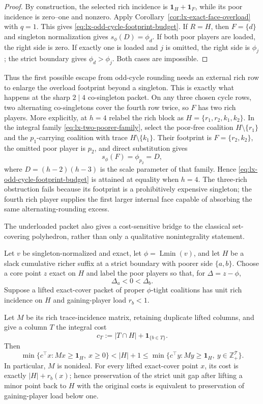\begin{proof}
By construction, the selected rich incidence is
$\mathbf1_H+\mathbf1_F$, while its poor incidence is zero--one and nonzero.
Apply Corollary~\ref{cor:lx-exact-face-overload} with $q=1$.  This gives
\eqref{eq:lx-odd-cycle-footprint-budget}.  If $R=H$, then $F=\{d\}$ and
singleton normalization gives $s_\phi(D)=\phi_d$.  If both poor players are
loaded, the right side is zero.  If exactly one is loaded and $j$ is omitted,
the right side is $\phi_j$; the strict boundary gives
$\phi_d>\phi_j$.  Both cases are impossible.
\end{proof}

Thus the first possible escape from odd-cycle rounding needs an external rich
row to enlarge the overload footprint beyond a singleton.  This is exactly
what happens at the sharp $2\mid4$ co-singleton packet.  On any three chosen
cycle rows, two alternating co-singletons cover the fourth row twice, so
$F$ has two rich players.  More explicitly, at $h=4$ relabel the rich block
as $H=\{r_1,r_2,k_1,k_2\}$.  In the integral family
\eqref{eq:lx-two-poorer-family}, select the poor-free coalition $H\setminus
\{r_1\}$ and the $p_1$-carrying coalition with trace $H\setminus\{k_1\}$.
Their footprint is $F=\{r_2,k_2\}$, the omitted poor player is $p_2$, and
direct substitution gives
\[
 s_\phi(F)=\phi_{p_2}=D,
\]
where $D=(h-2)(h-3)$ is the scale parameter of that family.  Hence
\eqref{eq:lx-odd-cycle-footprint-budget} is attained at equality when $h=4$.
The three-rich obstruction fails because its footprint is a prohibitively
expensive singleton; the fourth rich player supplies the first larger
internal face capable of absorbing the same alternating-rounding excess.

The underloaded packet also gives a cost-sensitive bridge to the classical
set-covering polyhedron, rather than only a qualitative nonintegrality
statement.

\begin{theorem}
\label{thm:lx-unit-gap-set-cover}
Let $v$ be singleton-normalized and exact, let
$\phi=\operatorname{Lmin}(v)$, and let $H$ be a slack cumulative richer
suffix at a strict boundary with poorer side $\{a,b\}$.  Choose a core point
$z$ exact on $H$ and label the poor players so that, for
$\Delta=z-\phi$,
\[
 \Delta_a<0<\Delta_b.
\]
Suppose a lifted exact-cover packet of proper $\phi$-tight coalitions has
unit rich incidence on $H$ and gaining-player load $r_b<1$.

Let $M$ be its rich trace-incidence matrix, retaining duplicate lifted
columns, and give a column $T$ the integral cost
\[
 c_T:=|T\cap H|+\mathbf1_{\{b\in T\}}.             \tag{UG-1}
 \label{eq:lx-unit-gap-cost}
\]
Then
\[
 \min\{c^\top x:Mx\geq\mathbf1_H,\ x\geq0\}
 <|H|+1
 \leq
 \min\{c^\top y:My\geq\mathbf1_H,\ y\in\mathbb Z_+^{\mathcal T}\}.
                                                               \tag{UG-2}
 \label{eq:lx-unit-gap}
\]
In particular, $M$ is nonideal.  For every lifted exact-cover point $x$,
its cost is exactly $|H|+r_b(x)$; hence preservation of the strict unit gap
after lifting a minor point back to $H$ with the original costs is equivalent
to preservation of gaining-player load below one.
\end{theorem}

